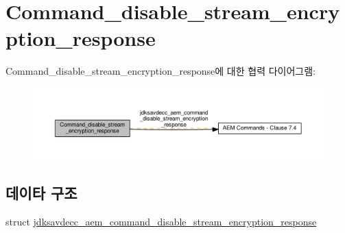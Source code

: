 \hypertarget{group__command__disable__stream__encryption__response}{}\section{Command\+\_\+disable\+\_\+stream\+\_\+encryption\+\_\+response}
\label{group__command__disable__stream__encryption__response}
Command\+\_\+disable\+\_\+stream\+\_\+encryption\+\_\+response에 대한 협력 다이어그램\+:
\nopagebreak
\begin{figure}[H]
\begin{center}
\leavevmode
\includegraphics[width=350pt]{group__command__disable__stream__encryption__response}
\end{center}
\end{figure}
\subsection*{데이타 구조}
\begin{DoxyCompactItemize}
\item 
struct \hyperlink{structjdksavdecc__aem__command__disable__stream__encryption__response}{jdksavdecc\+\_\+aem\+\_\+command\+\_\+disable\+\_\+stream\+\_\+encryption\+\_\+response}
\end{DoxyCompactItemize}
